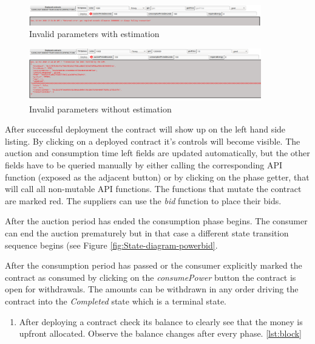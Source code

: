 \documentclass[a4paper]{article}
\begin{document}
\begin{figure}[H]
    \centering
    \includegraphics[width=0.9\textwidth]{figures/error-withestimation.png}
    \caption{Invalid parameters with estimation}
    \label{fig:deploy-error-noest}
\end{figure}

\begin{figure}[H]
    \centering
    \includegraphics[width=0.9\textwidth]{figures/error-noestimation.png}
    \caption{Invalid parameters without estimation}
    \label{fig:deploy-error-est}
\end{figure}


After successful deployment the contract will show up on the left hand side listing. By clicking on a deployed contract it's controls will become visible. The auction and consumption time left fields are updated automatically, but the other fields have to be queried manually by either calling the corresponding API function (exposed as the adjacent button) or by clicking on the phase getter, that will call all non-mutable API functions. The functions that mutate the contract are marked red. The suppliers can use the \emph{bid} function to place their bids.

After the auction period has ended the consumption phase begins. The consumer can end the auction prematurely but in that case a different state transition sequence begins (see Figure \ref{fig:State-diagram-powerbid}.

After the consumption period has passed or the consumer explicitly marked the contract as consumed by clicking on the \emph{consumePower} button the contract is open for withdrawals. The amounts can be withdrawn in any order driving the contract into the \emph{Completed} state which is a terminal state.


\begin{enumerate}[label=\textbf{Task \arabic*}:,l_tasks]
\item After deploying a contract check its balance to clearly see that the money is upfront allocated. Observe the balance changes after every phase. \ref{lst:block}
\end{enumerate}
\end{document}
